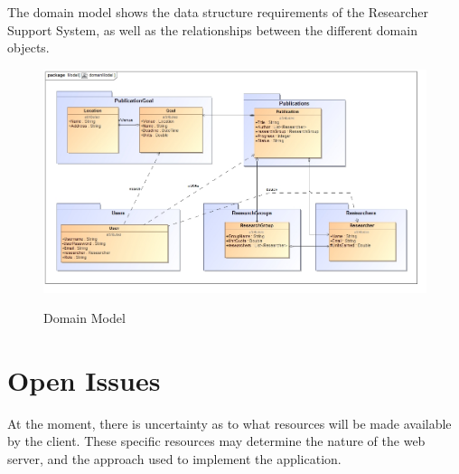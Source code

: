 \documentclass{article}
\begin{document}
	The domain model shows the data structure requirements of the Researcher Support System, as well as the relationships between the different domain objects. 

	\begin{figure}[H]
		\includegraphics[width=\textwidth]{domainModelB.jpg}  \\
		\caption{Domain Model}
	\end{figure}
	
\newpage

\section{Open Issues}

At the moment, there is uncertainty as to what resources will be made available by the client. These specific resources may determine the nature of the web server, and the approach used to implement the application.
\end{document}
